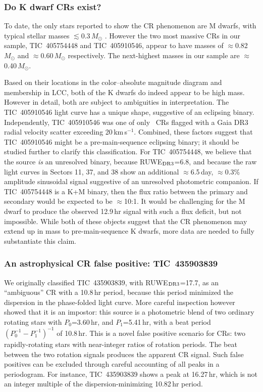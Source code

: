 \documentclass[11pt,twocolumn,tighten]{aastex63}
\newcommand{\kms}{{km\,s$^{-1}$}}
\begin{document}
\subsubsection{Do K dwarf CRs exist?}
\label{subsec:massive}

To date, the only stars reported to show the CR phenomenon are M
dwarfs, with typical stellar masses $\lesssim$0.3\,$M_\odot$
\citep{2017AJ....153..152S,2022AJ....163..144G}.  However the two most
massive CRs in our sample, TIC~405754448 and TIC~405910546, appear to
have masses of $\approx$0.82\,$M_\odot$ and $\approx$0.60\,$M_\odot$
respectively.  The next-highest masses in our sample are
$\approx$0.40\,$M_\odot$.

Based on their locations in the color--absolute magnitude
diagram and membership in LCC, both of the K dwarfs do indeed appear
to be high mass.  However in detail, both are subject to ambiguities
in interpretation.  The TIC~405910546 light curve has a unique shape,
suggestive of an eclipsing binary.  Independently, TIC~405910546 was
one of only \nrvscatterflag\ CRs flagged with a Gaia DR3 radial
velocity scatter exceeding 20\,\kms.  Combined, these factors suggest
that TIC~405910546 might be a pre-main-sequence eclipsing binary; it
should be studied further to clarify this classification.  For
TIC~405754448, we believe that the source {\it is} an unresolved
binary, because RUWE$_{\rm DR3}$=6.8, and because the raw light curves
in Sectors 11, 37, and 38 show an additional $\approx$6.5\,day,
$\approx$0.3\% amplitude sinusoidal signal suggestive of an unresolved
photometric companion.  If TIC~405754448 is a K+M binary, then the
flux ratio between the primary and secondary would be expected to be
$\approx$10:1.  It would be challenging for the M dwarf to produce the
observed 12.9\,hr signal with such a flux deficit, but not impossible.
While both of these objects suggest that the CR phenomenon may extend
up in mass to pre-main-sequence K dwarfs, more data are needed to
fully substantiate this claim.

\subsubsection{An astrophysical CR false positive: TIC~435903839}

We originally classified TIC~435903839, with RUWE$_{\rm DR3}$=17.7, as
an ``ambiguous'' CR with a 10.8\,hr period, because this period
minimized the dispersion in the phase-folded light curve.  More
careful inspection however showed that it is an impostor:
this source is a photometric blend of two ordinary rotating stars with
$P_0$=3.60\,hr, and $P_1$=5.41\,hr, with a beat period $(P_0^{-1} -
P_1^{-1})^{-1}$ of 10.8\,hr.  This is a novel false positive scenario
for CRs: two rapidly-rotating stars with near-integer ratios of
rotation periods.  The beat between the two rotation signals produces
the apparent CR signal.  Such false positives can be excluded through
careful accounting of all peaks in a periodogram.  For instance,
TIC~435903839 shows a peak at 16.27\,hr, which is not an integer
multiple of the dispersion-minimizing 10.82\,hr period.
\end{document}
